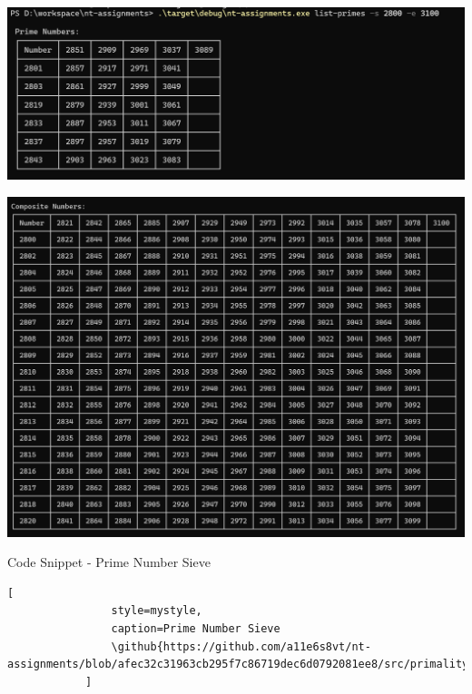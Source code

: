\documentclass[11pt,a4paper]{article}
\newcommand{\github}[1]{%
	\href{#1}{\faGithubSquare}%
}
\begin{document}
\begin{enumerate}[1.]
\begin{flushleft}
			\begin{minipage}{\linewidth}
				\begin{center}
					\includegraphics[scale=.45]{primes.png}
					\label{figure1:primes}
				\end{center}
			\end{minipage}

			\bigbreak
			\bigbreak
			\begin{minipage}{\linewidth}
				\begin{center}
				\includegraphics[scale=.45]{composites.png}
				\label{figure2:composites}
				\end{center}
			\end{minipage}

			\bigbreak
			\bigbreak
			Code Snippet - Prime Number Sieve
			\begin{lstlisting}[
				style=mystyle,
				caption=Prime Number Sieve
				\github{https://github.com/a11e6s8vt/nt-assignments/blob/afec32c31963cb295f7c86719dec6d0792081ee8/src/primality.rs\#L57}
			]


\end{lstlisting}
\end{flushleft}
\end{enumerate}
\end{document}
